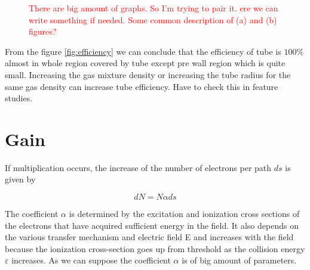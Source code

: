 \documentclass[]{article}
\begin{document}
	\begin{figure}[h!]
		\centering
		\qquad
		\caption{ \textcolor{red}{ There are big amount of graphs. So I'm trying to pair it. ere we can write something if needed. Some common description of (a) and (b) figures?} }
	\end{figure}
	
	From the figure \ref{fig:efficiency} we can conclude that the efficiency of tube is $100\%$ almost in whole region covered by tube except pre wall region which is quite small. Increasing the gas mixture density or increasing the tube radius for the same gas density can increase tube efficiency. Have to check this in feature studies.
		 
	\section{Gain}
	
	If multiplication occurs, the increase of the number of electrons per path $ds$ is given by
	
	\begin{equation}
		dN = N \alpha ds
		\label{eq:diffGain}
	\end{equation}
	
	The coefficient $\alpha$ is determined by the excitation and ionization cross sections of the electrons that have acquired sufficient energy in the field. It also depends on the various transfer mechanism and electric field E and increases with the field because the ionization cross-section goes up from threshold as the collision energy $\varepsilon$ increases. As we can suppose the coefficient $\alpha$ is of big amount of parameters.
	
\end{document}
